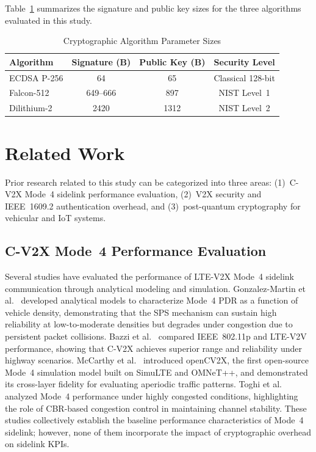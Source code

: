 \documentclass[letterpaper,journal]{IEEEtran}
\begin{document}
Table~\ref{tab:crypto_sizes} summarizes the signature and public key sizes for the three algorithms evaluated in this study.

\begin{table}[!htbp]
    \caption{Cryptographic Algorithm Parameter Sizes}
    \label{tab:crypto_sizes}
    \centering
    \begin{tabular}{lccc}
    \toprule
    \textbf{Algorithm} & \textbf{Signature (B)} & \textbf{Public Key (B)} & \textbf{Security Level} \\
    \midrule
    ECDSA P-256    & 64        & 65      & Classical 128-bit \\
    Falcon-512     & 649--666  & 897     & NIST Level~1 \\
    Dilithium-2    & 2420      & 1312    & NIST Level~2 \\
    \bottomrule
    \end{tabular}
\end{table}

\section{Related Work}
\label{sec:related}

Prior research related to this study can be categorized into three areas: (1)~C-V2X Mode~4 sidelink performance evaluation, (2)~V2X security and IEEE~1609.2 authentication overhead, and (3)~post-quantum cryptography for vehicular and IoT systems.

\subsection{C-V2X Mode~4 Performance Evaluation}

Several studies have evaluated the performance of LTE-V2X Mode~4 sidelink communication through analytical modeling and simulation. Gonzalez-Martin et al.~\cite{gonzalez2019analytical} developed analytical models to characterize Mode~4 PDR as a function of vehicle density, demonstrating that the SPS mechanism can sustain high reliability at low-to-moderate densities but degrades under congestion due to persistent packet collisions. Bazzi et al.~\cite{bazzi2017performance} compared IEEE~802.11p and LTE-V2V performance, showing that C-V2X achieves superior range and reliability under highway scenarios. McCarthy et al.~\cite{mccarthy2020opencvx} introduced openCV2X, the first open-source Mode~4 simulation model built on SimuLTE and OMNeT++, and demonstrated its cross-layer fidelity for evaluating aperiodic traffic patterns. Toghi et al.~\cite{toghi2019congestion} analyzed Mode~4 performance under highly congested conditions, highlighting the role of CBR-based congestion control in maintaining channel stability. These studies collectively establish the baseline performance characteristics of Mode~4 sidelink; however, none of them incorporate the impact of cryptographic overhead on sidelink KPIs.
\end{document}
